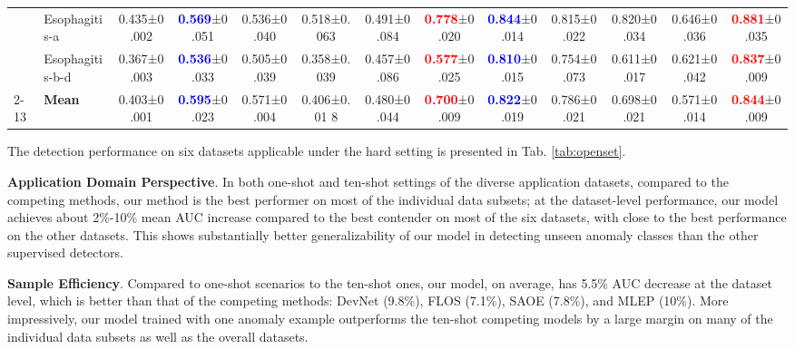\documentclass[10pt,twocolumn,letterpaper]{article}
\begin{document}
\begin{table*}[bt]
{\begin{tabular}{l@{}l@{}|c||ccccc||ccccc}
          & Esophagitis-a & 0.435\footnotesize{±0.002}& \textcolor{blue}{\textbf{0.569}}\footnotesize{±0.051}& 0.536\footnotesize{±0.040}& 0.518\footnotesize{±0.063}& 0.491\footnotesize{±0.084}& \textcolor{red}{\textbf{0.778}}\footnotesize{±0.020}& \textcolor{blue}{\textbf{0.844}}\footnotesize{±0.014}& 0.815\footnotesize{±0.022}& 0.820\footnotesize{±0.034}& 0.646\footnotesize{±0.036}& \textcolor{red}{\textbf{0.881}}\footnotesize{±0.035} \\
          & Esophagitis-b-d &  0.367\footnotesize{±0.003}& \textcolor{blue}{\textbf{0.536}}\footnotesize{±0.033}& 0.505\footnotesize{±0.039}& 0.358\footnotesize{±0.039}& 0.457\footnotesize{±0.086}& \textcolor{red}{\textbf{0.577}}\footnotesize{±0.025}& \textcolor{blue}{\textbf{0.810}}\footnotesize{±0.015}& 0.754\footnotesize{±0.073}& 0.611\footnotesize{±0.017}& 0.621\footnotesize{±0.042}& \textcolor{red}{\textbf{0.837}}\footnotesize{±0.009} \\
          \cline{2-13}
          & \textbf{Mean}  & 0.403\footnotesize{±0.001}& \textcolor{blue}{\textbf{0.595}}\footnotesize{±0.023}& 0.571\footnotesize{±0.004}& 0.406\footnotesize{±0.01 8}& 0.480\footnotesize{±0.044}& \textcolor{red}{\textbf{0.700}}\footnotesize{±0.009}& \textcolor{blue}{\textbf{0.822}}\footnotesize{±0.019}& 0.786\footnotesize{±0.021}& 0.698\footnotesize{±0.021}& 0.571\footnotesize{±0.014}& \textcolor{red}{\textbf{0.844}}\footnotesize{±0.009} \\
    \hline
    \end{tabular}}
  \label{tab:openset}\vspace{-0.3cm}
\end{table*}

The detection performance on six datasets applicable under the hard setting
is 
presented in Tab. \ref{tab:openset}.  

\textbf{Application Domain Perspective}. In both one-shot and ten-shot settings of the diverse application datasets, compared to the competing methods, our method is the best performer on most of the individual data subsets; at the dataset-level performance, our model achieves about 2\%-10\% mean AUC increase compared to the best contender on most of the six datasets, with close to the best performance on the other datasets. This shows substantially better generalizability of our model in detecting unseen anomaly classes than the other supervised detectors.

\textbf{Sample Efficiency}. Compared to one-shot scenarios to the ten-shot ones, our model, on average, has 5.5\% AUC decrease at the dataset level, 
which is better than that of the competing methods: DevNet (9.8\%), FLOS (7.1\%), SAOE (7.8\%), and MLEP (10\%). More impressively, our model trained with one anomaly example outperforms the ten-shot competing models by a large margin on many of the individual data subsets as well as the overall datasets.
\end{document}
